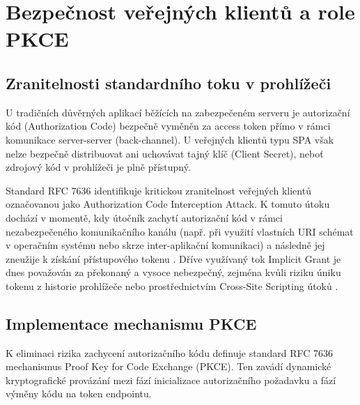 \documentclass[male,czech,api_bc]{kitheses}
\begin{document}
\section{Bezpečnost veřejných klientů a role PKCE}

\subsection{Zranitelnosti standardního toku v prohlížeči}

U tradičních důvěrných aplikací běžících na zabezpečeném serveru je autorizační kód (Authorization Code) bezpečně vyměněn za access token přímo v rámci komunikace server-server (back-channel). U veřejných klientů typu SPA však nelze bezpečně distribuovat ani uchovávat tajný klíč (Client Secret), neboť zdrojový kód v prohlížeči je plně přístupný.

Standard RFC 7636 \cite{SakimuraEd2015} identifikuje kritickou zranitelnost veřejných klientů označovanou jako Authorization Code Interception Attack. K tomuto útoku dochází v momentě, kdy útočník zachytí autorizační kód v rámci nezabezpečeného komunikačního kanálu (např. při využití vlastních URI schémat v operačním systému nebo skrze inter-aplikační komunikaci) a následně jej zneužije k získání přístupového tokenu \cite{SakimuraEd2015}. Dříve využívaný tok Implicit Grant je dnes považován za překonaný a vysoce nebezpečný, zejména kvůli riziku úniku tokenu z historie prohlížeče nebo prostřednictvím Cross-Site Scripting útoků \cite{Denniss2017,Lodderstedt2025}.

\subsection{Implementace mechanismu PKCE}
\label{subsec:pkce_mechanismus}

K eliminaci rizika zachycení autorizačního kódu definuje standard RFC 7636 \cite{SakimuraEd2015} mechanismus Proof Key for Code Exchange (PKCE). Ten zavádí dynamické kryptografické provázání mezi fází inicializace autorizačního požadavku a fází výměny kódu na token endpointu.
\end{document}

